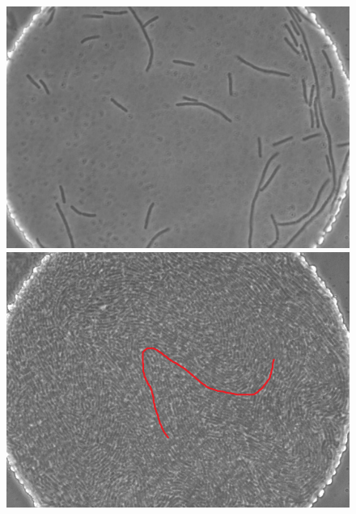 \documentclass[a4paper,11pt]{jsarticle}
\begin{document}
\begin{figure}[htbp]
\begin{minipage}{0.45\linewidth}
    \centering
    \includegraphics[width=\columnwidth]{Series015_t020000_RAW_ch00.pdf}
    \caption{}
    \label{fig:3}
  \end{minipage}
  \begin{minipage}{0.45\linewidth}
    \centering
    \includegraphics[width=\columnwidth]{Series015_t180000_RAW_ch00.png}
    \caption{}
    \label{fig:4}
  \end{minipage}
\end{figure}
\end{document}
